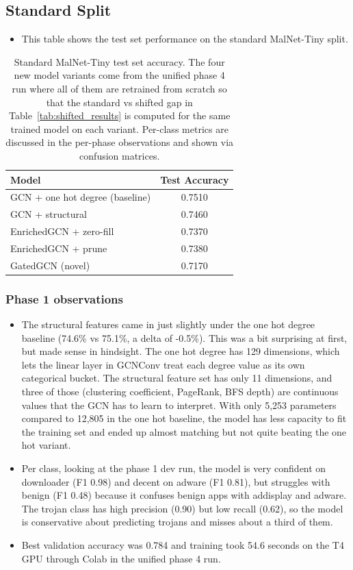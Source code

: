\documentclass[12pt]{article}
\begin{document}
\subsection{Standard Split}

\begin{itemize}
    \item This table shows the test set performance on the standard MalNet-Tiny split.
\end{itemize}

\begin{table}[h]
\centering
\begin{tabular}{lc}
\hline
\textbf{Model} & \textbf{Test Accuracy} \\
\hline
GCN + one hot degree (baseline) & 0.7510 \\
GCN + structural & 0.7460 \\
EnrichedGCN + zero-fill & 0.7370 \\
EnrichedGCN + prune & 0.7380 \\
GatedGCN (novel) & 0.7170 \\
\hline
\end{tabular}
\caption{Standard MalNet-Tiny test set accuracy. The four new model variants come from the unified phase 4 run where all of them are retrained from scratch so that the standard vs shifted gap in Table~\ref{tab:shifted_results} is computed for the same trained model on each variant. Per-class metrics are discussed in the per-phase observations and shown via confusion matrices.}
\label{tab:standard_results}
\end{table}

\subsubsection{Phase 1 observations}

\begin{itemize}
    \item The structural features came in just slightly under the one hot degree baseline (74.6\% vs 75.1\%, a delta of -0.5\%). This was a bit surprising at first, but made sense in hindsight. The one hot degree has 129 dimensions, which lets the linear layer in GCNConv treat each degree value as its own categorical bucket. The structural feature set has only 11 dimensions, and three of those (clustering coefficient, PageRank, BFS depth) are continuous values that the GCN has to learn to interpret. With only 5,253 parameters compared to 12,805 in the one hot baseline, the model has less capacity to fit the training set and ended up almost matching but not quite beating the one hot variant.
    \item Per class, looking at the phase 1 dev run, the model is very confident on downloader (F1 0.98) and decent on adware (F1 0.81), but struggles with benign (F1 0.48) because it confuses benign apps with addisplay and adware. The trojan class has high precision (0.90) but low recall (0.62), so the model is conservative about predicting trojans and misses about a third of them.
    \item Best validation accuracy was 0.784 and training took 54.6 seconds on the T4 GPU through Colab in the unified phase 4 run.
\end{itemize}
\end{document}
